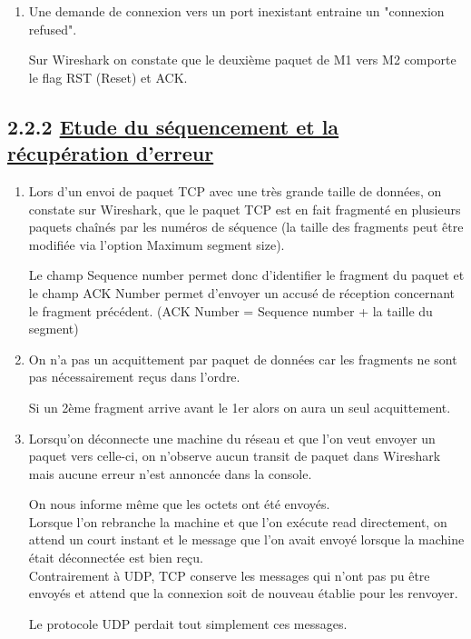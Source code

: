 \documentclass{article}
\begin{document}
\begin{enumerate}[resume]
	\item Une demande de connexion vers un port inexistant entraine un "connexion refused".

Sur Wireshark on constate que le deuxième paquet de M1 vers M2 comporte le flag RST (Reset) et ACK.

\end{enumerate}
\subsection*{2.2.2 \underline{Etude du séquencement et la récupération d'erreur}}

\begin{enumerate}[resume]
	\item Lors d'un envoi de paquet TCP avec une très grande taille de données, on constate sur Wireshark, que le paquet TCP est en fait fragmenté en plusieurs paquets chaînés par les numéros de séquence (la taille des fragments peut être modifiée via l'option Maximum segment size).

Le champ Sequence number permet donc d'identifier le fragment du paquet et le champ ACK Number permet d'envoyer un accusé de réception concernant le fragment précédent. (ACK Number = Sequence number + la taille du segment)

	\item On n'a pas un acquittement par paquet de données car les fragments ne sont pas nécessairement reçus dans l'ordre.

Si un 2ème fragment arrive avant le 1er alors on aura un seul acquittement.

	\item Lorsqu'on déconnecte une machine du réseau et que l'on veut envoyer un paquet vers celle-ci, on n'observe aucun transit de paquet dans Wireshark mais aucune erreur n'est annoncée dans la console.

On nous informe même que les octets ont été envoyés.\\

Lorsque l'on rebranche la machine et que l'on exécute read directement, on attend un court instant et le message que l'on avait envoyé lorsque la machine était déconnectée est bien reçu.\\

Contrairement à UDP, TCP conserve les messages qui n'ont pas pu être envoyés et attend que la connexion soit de nouveau établie pour les renvoyer.

Le protocole UDP perdait tout simplement ces messages.


\end{enumerate}
\end{document}
